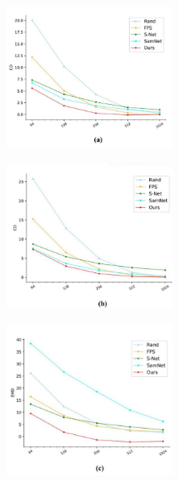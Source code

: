 \documentclass[review]{article}
\begin{document}
\begin{figure}[H]
    \centering
    \begin{subfigure}[b]{0.4\textwidth}
         \centering
         \includegraphics[width=0.6\textwidth]{pic11.jpg}
        
     \end{subfigure}
     \begin{subfigure}[b]{0.4\textwidth}
         \centering
         \includegraphics[width=0.6\textwidth]{pic12.jpg}
        
     \end{subfigure}
     \begin{subfigure}[b]{0.4\textwidth}
         \centering
         \includegraphics[width=0.6\textwidth]{pic13.jpg}
        

\end{subfigure}
\end{figure}
\end{document}
